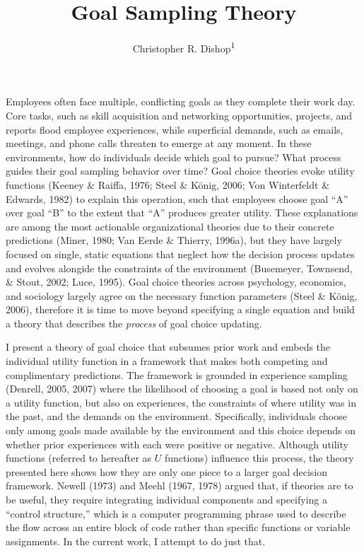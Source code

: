\documentclass[english,,man]{apa6}
\title{Goal Sampling Theory}
\author{Christopher R. Dishop\textsuperscript{1}}
\date{}
\affiliation{
\vspace{0.5cm}
\textsuperscript{1} Michigan State University}
\theoremstyle{definition}
\theoremstyle{definition}
\theoremstyle{definition}
\theoremstyle{remark}
\begin{document}
\maketitle

Employees often face multiple, conflicting goals as they complete their
work day. Core tasks, such as skill acquisition and networking
opportunities, projects, and reports flood employee experiences, while
superficial demands, such as emails, meetings, and phone calls threaten
to emerge at any moment. In these environments, how do individuals
decide which goal to pursue? What process guides their goal sampling
behavior over time? Goal choice theories evoke utility functions (Keeney
\& Raiffa, 1976; Steel \& König, 2006; Von Winterfeldt \& Edwards, 1982)
to explain this operation, such that employees choose goal \enquote{A}
over goal \enquote{B} to the extent that \enquote{A} produces greater
utility. These explanations are among the most actionable organizational
theories due to their concrete predictions (Miner, 1980; Van Eerde \&
Thierry, 1996a), but they have largely focused on single, static
equations that neglect how the decision process updates and evolves
alongide the constraints of the environment (Busemeyer, Townsend, \&
Stout, 2002; Luce, 1995). Goal choice theories across psychology,
economics, and sociology largely agree on the necessary function
parameters (Steel \& König, 2006), therefore it is time to move beyond
specifying a single equation and build a theory that describes the
\emph{process} of goal choice updating.

I present a theory of goal choice that subsumes prior work and embeds
the individual utility function in a framework that makes both competing
and complimentary predictions. The framework is grounded in experience
sampling (Denrell, 2005, 2007) where the likelihood of choosing a goal
is based not only on a utility function, but also on experiences, the
constraints of where utility was in the past, and the demands on the
environment. Specifically, individuals choose only among goals made
available by the environment and this choice depends on whether prior
experiences with each were positive or negative. Although utility
functions (referred to hereafter as \(U\) functions) influence this
process, the theory presented here shows how they are only one piece to
a larger goal decision framework. Newell (1973) and Meehl (1967, 1978)
argued that, if theories are to be useful, they require integrating
individual components and specifying a \enquote{control structure,}
which is a computer programming phrase used to describe the flow across
an entire block of code rather than specific functions or variable
assignments. In the current work, I attempt to do just that.
\end{document}
